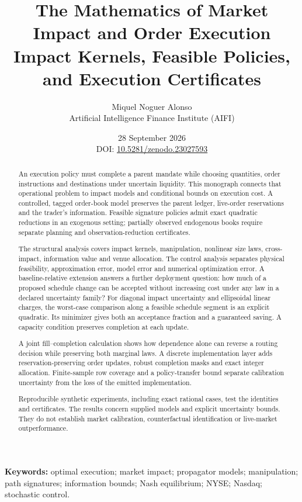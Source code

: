 \documentclass[11pt]{article}
\title{The Mathematics of Market Impact and Order Execution\\[2pt]
\large Impact Kernels, Feasible Policies, and Execution Certificates}
\author{Miquel Noguer Alonso\\ Artificial Intelligence Finance Institute (AIFI)}
\date{28 September 2026\\[5pt]\small DOI:
\href{https://doi.org/10.5281/zenodo.23027593}{10.5281/zenodo.23027593}}
\numberwithin{equation}{section}
\theoremstyle{definition}
\theoremstyle{remark}
\theoremstyle{definition}
\begin{document}
\maketitle
\begin{abstract}
An execution policy must complete a parent mandate while choosing quantities,
order instructions and destinations under uncertain liquidity. This monograph
connects that operational problem to impact models and conditional bounds on
execution cost. A controlled, tagged order-book model preserves the parent
ledger, live-order reservations and the trader's information. Feasible
signature policies admit exact quadratic reductions in an exogenous setting;
partially observed endogenous books require separate planning and
observation-reduction certificates.

The structural analysis covers impact kernels, manipulation, nonlinear
size laws, cross-impact, information value and venue allocation. The control
analysis separates physical feasibility, approximation error, model error
and numerical optimization error. A baseline-relative extension answers a
further deployment question: how much of a proposed schedule change can be
accepted without increasing cost under any law in a declared uncertainty
family? For diagonal impact uncertainty and ellipsoidal linear charges, the
worst-case comparison along a feasible schedule segment is an explicit
quadratic. Its minimizer gives both an acceptance fraction and a guaranteed
saving. A capacity condition preserves completion at each update.

A joint fill--completion calculation shows how dependence alone can reverse
a routing decision while preserving both marginal laws.
A discrete implementation layer adds reservation-preserving order updates,
robust completion masks and exact integer allocation. Finite-sample row
coverage and a policy-transfer bound separate calibration uncertainty from
the loss of the emitted implementation.

Reproducible synthetic experiments, including exact rational cases, test
the identities and certificates. The results concern supplied models and
explicit uncertainty bounds. They do not establish market calibration,
counterfactual identification or live-market outperformance.
\end{abstract}

\noindent\textbf{Keywords:} optimal execution; market impact; propagator models; manipulation; path signatures; information bounds; Nash equilibrium; NYSE; Nasdaq; stochastic control.
\newpage
\tableofcontents
\newpage
\end{document}
